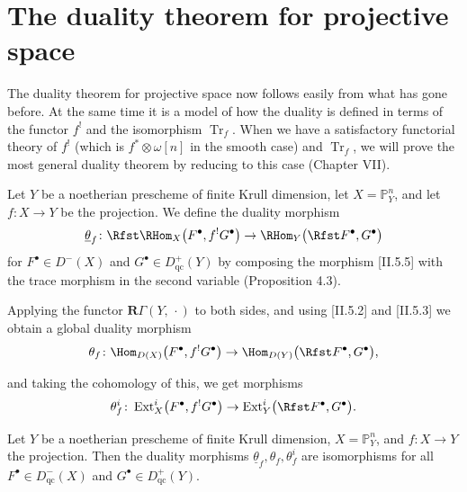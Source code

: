 
\setcounter{page}{160}
\section{The duality theorem for projective space}

The duality theorem for projective space now follows easily from what has gone before. At the same time it is a model of how the duality is defined in terms of the functor \(f^!\) and the isomorphism \(\operatorname{Tr}_f\). When we have a satisfactory functorial theory of \(f^!\) (which is \(f^*\otimes\omega[n]\) in the smooth case) and \(\operatorname{Tr}_f\), we will prove the most general duality theorem by reducing to this case (Chapter VII).

Let \(Y\) be a noetherian prescheme of finite Krull dimension, let \(X=\mathbb{P}_{Y}^{n}\), and let \(f\colon X \to Y\) be the projection. We define the duality morphism
\[
\underline{\theta}_{f}\colon 
\Rfst \RHom_X\bigl(F^\bullet,f^! G^\bullet\bigr)
\to \RHom_Y\bigl(\Rfst F^\bullet,G^\bullet\bigr)
\]
for \(F^\bullet \in D^-(X)\) and \(G^\bullet \in D_{\mathrm{qc}}^+(Y)\) by composing the morphism [II.5.5] with the trace morphism in the second variable (Proposition 4.3).

Applying the functor \(\mathbf{R}\Gamma(Y,\,\cdot)\) to both sides, and using [II.5.2] and [II.5.3] we obtain a global duality morphism
\[
\theta_{f}\colon 
\Hom_{D(X)}\bigl(F^\bullet,f^! G^\bullet\bigr)
\to \Hom_{D(Y)}\bigl(\Rfst F^\bullet,G^\bullet\bigr),
\]

\setcounter{page}{161}
and taking the cohomology of this, we get morphisms
\[
\theta_{f}^{i}\colon 
\operatorname{Ext}_{X}^{i}\bigl(F^\bullet,f^! G^\bullet\bigr)
\to \operatorname{Ext}_{Y}^{i}\bigl(\Rfst F^\bullet,G^\bullet\bigr).
\]

\begin{theorem}
Let \(Y\) be a noetherian prescheme of finite Krull dimension, \(X=\mathbb{P}_{Y}^{n}\), and \(f\colon X\to Y\) the projection. Then the duality morphisms \(\underline{\theta}_f,\theta_f,\theta_f^i\) are isomorphisms for all \(F^\bullet \in D_{\mathrm{qc}}^-(X)\) and \(G^\bullet \in D_{\mathrm{qc}}^+(Y)\).
\end{theorem}

